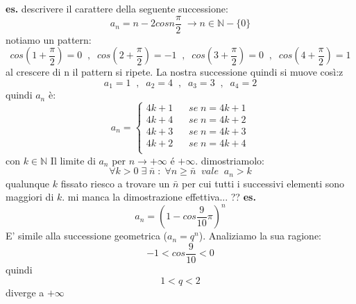 \textbf{es.} descrivere il carattere della seguente successione:
\[
    a_n = n-2 cos n \frac{\pi}{2} \;\rightarrow n\in \mathbb{N}- \{0\}
\]
notiamo un pattern:
\[
    cos(1+ \frac{\pi}{2}) = 0 \;\;,\;\;
    cos(2+ \frac{\pi}{2}) = -1 \;\;,\;\;
    cos(3+ \frac{\pi}{2}) = 0 \;\;,\;\;
    cos(4+ \frac{\pi}{2}) = 1
\]
al crescere di n il pattern si ripete. La nostra successione quindi si muove così:z
\[
    a_1 = 1 \;\;,\;\;
    a_2 = 4 \;\;,\;\;
    a_3 = 3 \;\;,\;\;
    a_4 = 2
\]
quindi $a_n$ è:
\[
    a_n = 
    \begin{cases}
        4k+1 \;\;\;&se \;n= 4k+1 \\
        4k+4 \;\;\;&se \;n = 4k+2\\
        4k+3 \;\;\;&se \;n= 4k+3\\
        4k+2 \;\;\;&se \;n= 4k+4\\
    \end{cases}
\]
con $k \in \mathbb{N}$
\newline
Il limite di $a_n$ per $n\rightarrow +\infty$ é $+\infty$.
\newline
dimostriamolo:
\[
    \forall k>0 \;\exists\; \bar{n} \;:\; \forall n \geq \bar{n} \;\;vale\;\; a_n> k
\]
qualunque $k$ fissato riesco a trovare un $\bar{n}$ per cui tutti i successivi elementi sono maggiori di $k$.
\newline
mi manca la dimostrazione effettiva... ??
\newline
\textbf{es.} 
\[
    a_n = (1-cos \frac{9}{10}\pi )^n
\]
E' simile alla successione geometrica ($a_n = q^n$).
\newline
Analiziamo la sua ragione:
\[
    -1 < cos \frac{9}{10} < 0
\]
quindi
\[
    1<q<2  
\]
diverge a $+\infty$
